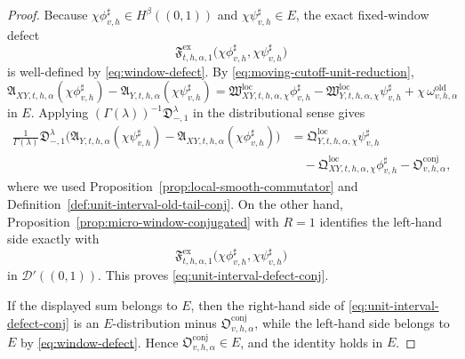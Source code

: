 \documentclass[11pt,a4paper]{amsart}
\theoremstyle{plain}
\theoremstyle{definition}
\theoremstyle{remark}
\begin{document}
\begin{proof}
Because \(\chi\phi_{v,h}^{\sharp}\in H^\beta((0,1))\) and \(\chi\psi_{v,h}^{\sharp}\in E\), the exact
fixed-window defect
\[
\mathfrak F_{t,h,\alpha,1}^{\mathrm{ex}}
\bigl(
\chi\phi_{v,h}^{\sharp},
\chi\psi_{v,h}^{\sharp}
\bigr)
\]
is well-defined by \eqref{eq:window-defect}. By
\eqref{eq:moving-cutoff-unit-reduction},
\[
\mathfrak A_{XY,t,h,\alpha}(\chi\phi_{v,h}^{\sharp})
-\mathfrak A_{Y,t,h,\alpha}(\chi\psi_{v,h}^{\sharp})
=
\mathfrak W_{XY,t,h,\alpha,\chi}^{\mathrm{loc}}\phi_{v,h}^{\sharp}
-\mathfrak W_{Y,t,h,\alpha,\chi}^{\mathrm{loc}}\psi_{v,h}^{\sharp}
+\chi\,\omega_{v,h,\alpha}^{\mathrm{old}}
\]
in \(E\). Applying \((\Gamma(\lambda))^{-1}\mathfrak D_{-,1}^{\lambda}\) in the distributional sense
gives
\begin{align*}
\frac{1}{\Gamma(\lambda)}
\mathfrak D_{-,1}^{\lambda}
\bigl(
\mathfrak A_{Y,t,h,\alpha}(\chi\psi_{v,h}^{\sharp})
-\mathfrak A_{XY,t,h,\alpha}(\chi\phi_{v,h}^{\sharp})
\bigr)
&=
\mathfrak Q_{Y,t,h,\alpha,\chi}^{\mathrm{loc}}\psi_{v,h}^{\sharp}\\
&\quad-
\mathfrak Q_{XY,t,h,\alpha,\chi}^{\mathrm{loc}}\phi_{v,h}^{\sharp}
-\mathfrak O_{v,h,\alpha}^{\mathrm{conj}},
\end{align*}
where we used Proposition~\ref{prop:local-smooth-commutator} and
Definition~\ref{def:unit-interval-old-tail-conj}. On the other hand,
Proposition~\ref{prop:micro-window-conjugated} with \(R=1\) identifies the left-hand side exactly
with
\[
\mathfrak F_{t,h,\alpha,1}^{\mathrm{ex}}
\bigl(
\chi\phi_{v,h}^{\sharp},
\chi\psi_{v,h}^{\sharp}
\bigr)
\]
in \(\mathcal D'((0,1))\). This proves \eqref{eq:unit-interval-defect-conj}.

If the displayed sum belongs to \(E\), then the right-hand side of
\eqref{eq:unit-interval-defect-conj} is an \(E\)-distribution minus
\(\mathfrak O_{v,h,\alpha}^{\mathrm{conj}}\), while the left-hand side belongs to \(E\) by
\eqref{eq:window-defect}. Hence \(\mathfrak O_{v,h,\alpha}^{\mathrm{conj}}\in E\), and the identity
holds in \(E\).
\end{proof}
\end{document}
